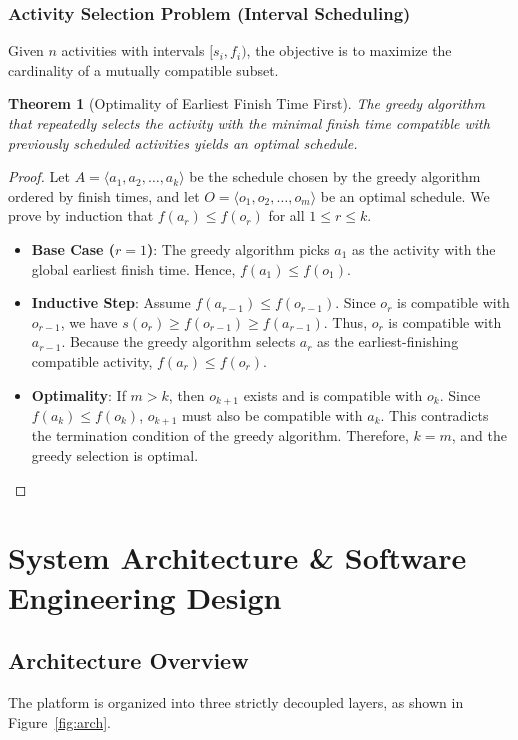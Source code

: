 \documentclass[11pt,a4paper]{article}
\theoremstyle{definition}
\theoremstyle{plain}
\newtheorem{theorem}{Theorem}[section]
\theoremstyle{remark}
\begin{document}
\subsubsection{Activity Selection Problem (Interval Scheduling)}
Given $n$ activities with intervals $[s_i, f_i)$, the objective is to maximize the cardinality of a mutually compatible subset.

\begin{theorem}[Optimality of Earliest Finish Time First]
The greedy algorithm that repeatedly selects the activity with the minimal finish time compatible with previously scheduled activities yields an optimal schedule.
\end{theorem}

\begin{proof}
Let $A = \langle a_1, a_2, \dots, a_k \rangle$ be the schedule chosen by the greedy algorithm ordered by finish times, and let $O = \langle o_1, o_2, \dots, o_m \rangle$ be an optimal schedule. We prove by induction that $f(a_r) \le f(o_r)$ for all $1 \le r \le k$.
\begin{itemize}
    \item \textbf{Base Case ($r=1$)}: The greedy algorithm picks $a_1$ as the activity with the global earliest finish time. Hence, $f(a_1) \le f(o_1)$.
    \item \textbf{Inductive Step}: Assume $f(a_{r-1}) \le f(o_{r-1})$. Since $o_r$ is compatible with $o_{r-1}$, we have $s(o_r) \ge f(o_{r-1}) \ge f(a_{r-1})$. Thus, $o_r$ is compatible with $a_{r-1}$. Because the greedy algorithm selects $a_r$ as the earliest-finishing compatible activity, $f(a_r) \le f(o_r)$.
    \item \textbf{Optimality}: If $m > k$, then $o_{k+1}$ exists and is compatible with $o_k$. Since $f(a_k) \le f(o_k)$, $o_{k+1}$ must also be compatible with $a_k$. This contradicts the termination condition of the greedy algorithm. Therefore, $k = m$, and the greedy selection is optimal.
\end{itemize}
\end{proof}

\section{System Architecture \& Software Engineering Design}

\subsection{Architecture Overview}
The platform is organized into three strictly decoupled layers, as shown in Figure~\ref{fig:arch}.
\end{document}
